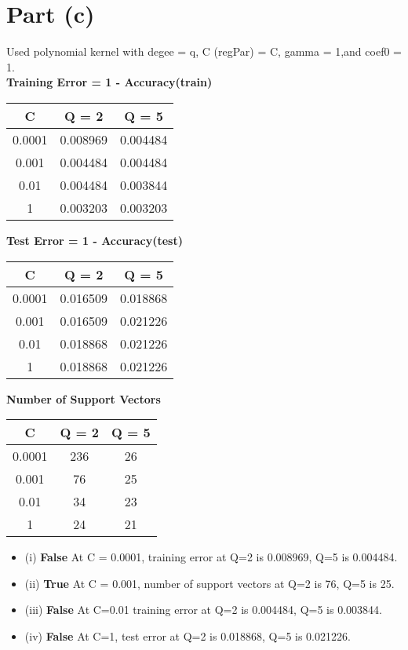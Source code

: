 \documentclass[12pt]{article}
\begin{document}
\section*{Part (c)}
Used polynomial kernel with degee = q, C (regPar) = C, gamma = 1,and coef0 = 1. \\
\textbf{Training Error = 1 - Accuracy(train)}
\begin{center}
    \begin{tabular}{|c|c|c|}
        \hline
        \textbf{C} & \textbf{Q = 2} & \textbf{Q = 5} \\
        \hline
        0.0001 & 0.008969 & 0.004484 \\
        0.001 & 0.004484 & 0.004484 \\
        0.01 & 0.004484 & 0.003844 \\
        1 & 0.003203 & 0.003203 \\
        \hline
    \end{tabular}
\end{center}
\textbf{Test Error = 1 - Accuracy(test)}
\begin{center}
    \begin{tabular}{|c|c|c|}
        \hline
        \textbf{C} & \textbf{Q = 2} & \textbf{Q = 5} \\
        \hline
        0.0001 & 0.016509 & 0.018868 \\
        0.001 & 0.016509 & 0.021226 \\
        0.01 & 0.018868 & 0.021226 \\
        1 & 0.018868 & 0.021226 \\
        \hline
    \end{tabular}
\end{center}
\textbf{Number of Support Vectors}
\begin{center}
    \begin{tabular}{|c|c|c|}
        \hline
        \textbf{C} & \textbf{Q = 2} & \textbf{Q = 5} \\
        \hline
        0.0001 & 236 & 26 \\
        0.001 & 76 & 25 \\
        0.01 & 34 & 23 \\
        1 & 24 & 21 \\
        \hline
    \end{tabular}
\end{center}

\begin{itemize}
    \item (i) \textbf{False} At C = 0.0001, training error at Q=2 is 0.008969, Q=5 is 0.004484.
    \item (ii) \textbf{True} At C = 0.001, number of support vectors at Q=2 is 76, Q=5 is 25.
    \item (iii) \textbf{False} At C=0.01 training error at Q=2 is 0.004484, Q=5 is 0.003844.
    \item (iv) \textbf{False} At C=1, test error at Q=2 is 0.018868, Q=5 is 0.021226.
\end{itemize}
\end{document}
